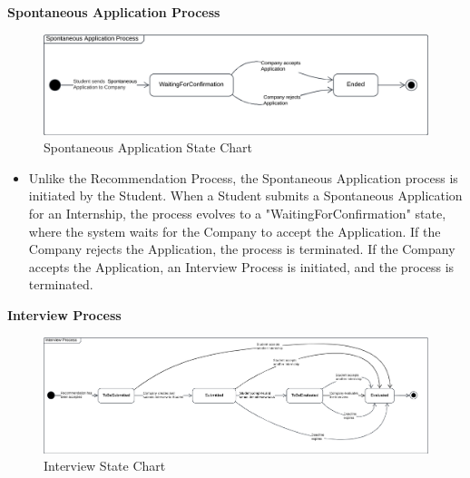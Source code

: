 \noindent\textbf{\color{titleColor}Spontaneous Application Process}\\
\begin{figure}[ht]
    \centering
    \includegraphics[width=1 \textwidth]{Latex/Images/SpontaneousApplicationStateChart.png}
    \caption{Spontaneous Application State Chart}
    \label{fig:SpontaneousApplication}
\end{figure}
\begin{itemize}
    \item Unlike the Recommendation Process, the Spontaneous Application process is initiated by the Student. When a Student submits a Spontaneous Application for an Internship, the process evolves to a "WaitingForConfirmation" state, where the system waits for the Company to accept the Application. If the Company rejects the Application, the process is terminated. If the Company accepts the Application, an Interview Process is initiated, and the process is terminated.
\end{itemize} 
\clearpage
\noindent\textbf{\color{titleColor}Interview Process}\\
\begin{figure}[H]
    \centering
    \includegraphics[width=1 \textwidth]{Latex/Images/InterviewProcessStateChart.png}
    \caption{Interview State Chart}
    \label{fig:InterviewProcess}
\end{figure}
